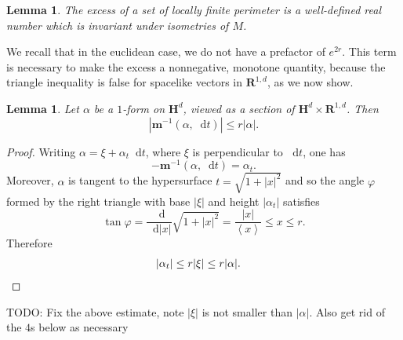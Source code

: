 \documentclass[reqno,12pt,letterpaper]{amsart}
\newcommand{\RR}{\mathbf{R}}
\newcommand{\Hyp}{\mathbf H}
\newcommand{\Mink}{\mathbf m}
\newcommand*\dif{\mathop{}\!\mathrm{d}}
\def\Japan#1{\left \langle #1 \right \rangle}
\newtheorem{lemma}[theorem]{Lemma}
\theoremstyle{definition}
\numberwithin{equation}{section}
\begin{document}
\begin{lemma}
The excess of a set of locally finite perimeter is a well-defined real number which is invariant under isometries of $M$.
\end{lemma}

We recall that in the euclidean case, we do not have a prefactor of $e^{2r}$.
This term is necessary to make the excess a nonnegative, monotone quantity, because the triangle inequality is false for spacelike vectors in $\RR^{1, d}$, as we now show.

\begin{lemma}
Let $\alpha$ be a $1$-form on $\Hyp^d$, viewed as a section of $\Hyp^d \times \RR^{1, d}$.
Then
$$|\Mink^{-1}(\alpha, \dif t)| \leq r |\alpha|.$$
\end{lemma}
\begin{proof}
Writing $\alpha = \xi + \alpha_t \dif t$, where $\xi$ is perpendicular to $\dif t$, one has
$$-\Mink^{-1}(\alpha, \dif t) = \alpha_t.$$
Moreover, $\alpha$ is tangent to the hypersurface $t = \sqrt{1 + |x|^2}$ and so the angle $\varphi$ formed by the right triangle with base $|\xi|$ and height $|\alpha_t|$ satisfies
$$\tan \varphi = \frac{\dif}{\dif |x|} \sqrt{1 + |x|^2} = \frac{|x|}{\Japan x} \leq x \leq r.$$
Therefore
\begin{align*}
|\alpha_t| &\leq r |\xi| \leq r |\alpha|. \qedhere
\end{align*}
\end{proof}

TODO: Fix the above estimate, note $|\xi|$ is not smaller than $|\alpha|$. Also get rid of the $4$s below as necessary
\end{document}

